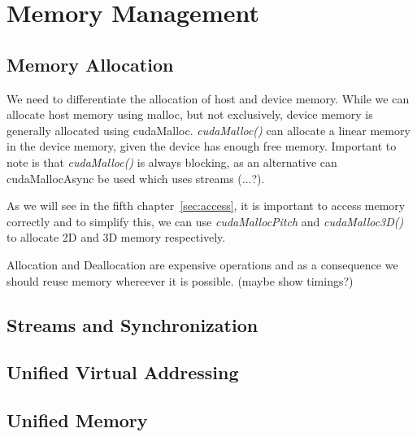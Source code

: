 \section{Memory Management}
\label{sec:management}
\subsection{Memory Allocation}
We need to differentiate the allocation of host and device memory.
While we can allocate host memory using malloc, but not exclusively, device memory is generally allocated using cudaMalloc.
\emph{cudaMalloc()} can allocate a linear memory in the device memory, given the device has enough free memory.
Important to note is that \emph{cudaMalloc()} is always blocking, as an alternative can cudaMallocAsync be used which uses streams (...?).


As we will see in the fifth chapter~\ref{sec:access}, 
it is important to access memory correctly and to simplify this, 
we can use \emph{cudaMallocPitch} and \emph{cudaMalloc3D()} to allocate 2D and 3D memory respectively.



Allocation and Deallocation are expensive operations and as a consequence we should reuse memory whereever it is possible.
(maybe show timings?)

\subsection{Streams and Synchronization}

\subsection{Unified Virtual Addressing}
\subsection{Unified Memory}

